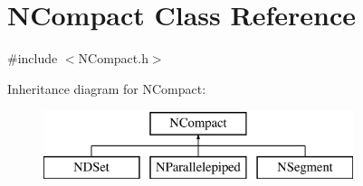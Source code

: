 \hypertarget{class_n_compact}{}\section{N\+Compact Class Reference}
\label{class_n_compact}


{\ttfamily \#include $<$N\+Compact.\+h$>$}

Inheritance diagram for N\+Compact\+:\begin{figure}[H]
\begin{center}
\leavevmode
\includegraphics[height=2.000000cm]{class_n_compact}
\end{center}
\end{figure}
